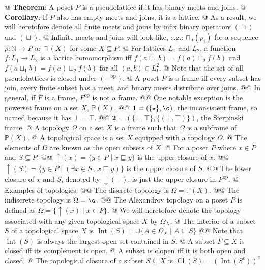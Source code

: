\documentclass[]{article}
\newcommand{\mbf}[1]{\ensuremath{\mathbf{#1}}}     %
\newcommand{\mbb}[1]{\ensuremath{\mathbb{#1}}}     %
\newcommand{\join}[0]{\ensuremath{\mathrel{\sqcup}}}
\newcommand{\meet}[0]{\ensuremath{\mathrel{\sqcap}}}
\newcommand{\bigmeet}[0]{\ensuremath{{\sqcap}\,}}
\newcommand{\poset}[0]{\ensuremath{\mathrel{\sqsubseteq}}}
\newcommand{\opcat}[1]{{#1}^{\mathrm{op}}}
\DeclareMathOperator{\interior}{Int}
\DeclareMathOperator{\closure}{Cl}
\renewcommand{\complement}[1]{{{#1}^{c}}}
\newcommand{\define}[1]{\textsf{#1}}
\begin{document}
\begin{easylist}[itemize]
{}
@ {%
  \textbf{Theorem}:
  A poset $P$ is a pseudolattice if it has binary meets and joins.
}
@ {%
  \textbf{Corollary}:
  If $P$ also has empty meets and joins, it is a lattice.
}
@ {%
  As a result, we will heretofore denote all finite meets and joins by infix
  binary operators $(\meet)$ and $(\join)$.
}
@ {%
  Infinite meets and joins will look like, e.g.: $\bigmeet_i(p_i)$ for a
  sequence $p : \mbb{N} \to P$ or $\bigmeet(X)$ for some $X \subseteq P$.
}
@ {%
  For lattices $L_1$ and $L_2$, a function $f : L_1 \to L_2$ is a
  \define{lattice homomorphism} iff $f(a \meet_1 b) = f(a) \meet_2 f(b)$
  and $f(a \join_1 b) = f(a) \join_2 f(b)$ for all $(a, b) \in L_1^2$.
}
@ Note that the set of all pseudolattices is closed under $(\opcat{-})$.
@ {%
  A poset $P$ is a \define{frame} iff every subset has join, every finite subset
  has a meet, and binary meets distribute over joins.
}
@@ In general, if $F$ is a frame, $\opcat{F}$ is not a frame.
@@ {%
  One notable exception is the \define{powerset frame} on a set $X$,
  $\mbb{P}(X)$.
}
@@ {%
  $\mbf{1} = (\{\star\}, \o)$, the \define{inconsistent frame}, so named
  because it has $\bot = \top$.
}
@@ $\mbf{2} = (\{\bot,\top\}, \{(\bot, \top)\})$, the \define{Sierpinski frame}.
@ {%
  A \define{topology} $\Omega$ on a set $X$ is a frame such that $\Omega$ is a
  subframe of $\mbb{P}(X)$.
}
@ A \define{topological space} is a set $X$ equipped with a topology $\Omega$.
@ The elements of $\Omega$ are known as the \define{open subsets} of $X$.
@ For a poset $P$ where $x \in P$ and $S \subseteq P$:
@@ {%
  ${\uparrow}(x) = \{y \in P \mid x \poset y\}$
  is the \define{upper closure} of $x$.
}
@@ {%
  ${\uparrow}(S) = \{y \in P \mid (\exists x \in S ~ . ~ x \poset y)\}$
  is the \define{upper closure} of $S$.
}
@@ {%
  The \define{lower closure} of $x$ and $S$, denoted by ${\downarrow}(-)$,
  is just the upper closure in $\opcat{P}$.
}
@ Examples of topologies:
@@ The \define{discrete topology} is $\Omega = \mbb{P}(X)$.
@@ The \define{indiscrete topology} is $\Omega = \o$.
@@ {%
  The \define{Alexandrov topology} on a poset $P$ is defined as
  $\Omega = \{{\uparrow}(x) \mid x \in P\}$.
}
@ {%
  We will heretofore denote the topology associated with any given topological
  space $X$ by $\Omega_X$.
}
@ {%
  The \define{interior} of a subset $S$ of a topological space $X$ is
  $\interior(S) = \cup \{A \in \Omega_X \mid A \subseteq S\}$
}
@@ Note that $\interior(S)$ is always the largest open set contained in $S$.
@ A subset $F \subseteq X$ is \define{closed} iff its complement is open.
@ A subset is \define{clopen} iff it is both open and closed.
@ {%
  The \define{topological closure} of a subset $S \subseteq X$ is
  $\closure(S) = \complement{(\interior(\complement{S}))}$
}
\end{easylist}
\end{document}
